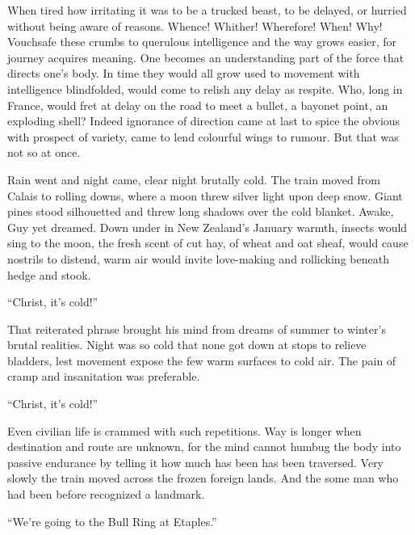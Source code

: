 When tired how irritating it was to be a trucked beast, to be delayed, or hurried 
without being aware of reasons. Whence! Whither! Wherefore! When! Why! Vouchsafe 
these crumbs to querulous intelligence and the way grows easier, for journey 
acquires meaning. One becomes an understanding part of the force that directs 
one's body. In time they would all grow used to movement with intelligence 
blindfolded, would come to relish any delay as respite. Who, long in France, would 
fret at delay on the road to meet a bullet, a bayonet point, an exploding shell? 
Indeed ignorance of direction came at last to spice the obvious with prospect of 
variety, came to lend colourful wings to rumour. But that was not so at once.

Rain went and night came, clear night brutally cold. The train moved from Calais 
to rolling downs, where a moon threw silver light upon deep snow. Giant pines stood 
silhouetted and threw long shadows over the cold blanket. Awake, Guy yet dreamed. 
Down under in New Zealand's January warmth, insects would sing to the moon, the 
fresh scent of cut hay, of wheat and oat sheaf, would cause nostrils to distend, 
warm air would invite love-making and rollicking beneath hedge and stook.

``Christ, it's cold!''

That reiterated phrase brought his mind from dreams of summer to winter's brutal 
realities. Night was so cold that none got down at stops to relieve bladders, lest 
movement expose the few warm surfaces to cold air. The pain of cramp and insanitation 
was preferable.

``Christ, it's cold!''

Even civilian life is crammed with such repetitions. Way is longer when destination 
and route are unknown, for the mind cannot humbug the body into passive endurance by 
telling it how much has been has been traversed. Very slowly the train moved across 
the frozen foreign lands. And the some man who had been before recognized a landmark. 

``We're going to the Bull Ring at Etaples.''
